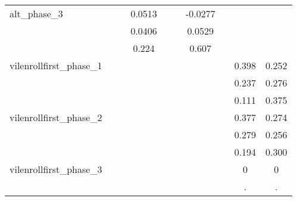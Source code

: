 {\begin{tabular}{l*{9}{c}}
alt\_phase\_3 &                     &                     &      0.0513         &                     &                     &     -0.0277         &                     &                     &                     \\
            &                     &                     &      0.0406         &                     &                     &      0.0529         &                     &                     &                     \\
            &                     &                     &       0.224         &                     &                     &       0.607         &                     &                     &                     \\
vilenrollfirst\_phase\_1&                     &                     &                     &                     &                     &                     &                     &       0.398         &       0.252         \\
            &                     &                     &                     &                     &                     &                     &                     &       0.237         &       0.276         \\
            &                     &                     &                     &                     &                     &                     &                     &       0.111         &       0.375         \\
vilenrollfirst\_phase\_2&                     &                     &                     &                     &                     &                     &                     &       0.377         &       0.274         \\
            &                     &                     &                     &                     &                     &                     &                     &       0.279         &       0.256         \\
            &                     &                     &                     &                     &                     &                     &                     &       0.194         &       0.300         \\
vilenrollfirst\_phase\_3&                     &                     &                     &                     &                     &                     &                     &           0         &           0         \\
            &                     &                     &                     &                     &                     &                     &                     &           .         &           .         \\

\end{tabular}}
